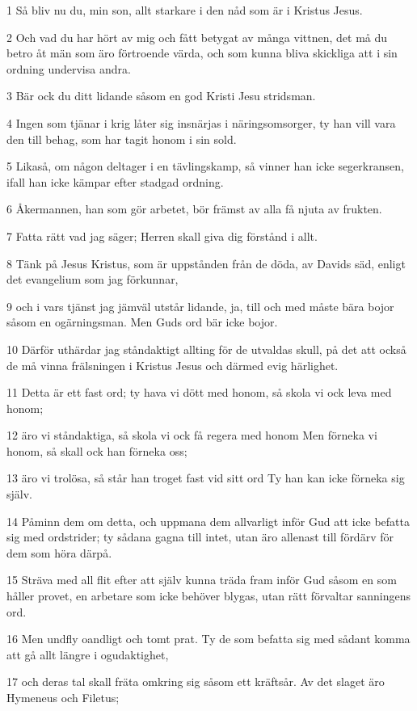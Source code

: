 \par 1 Så bliv nu du, min son, allt starkare i den nåd som är i Kristus Jesus.
\par 2 Och vad du har hört av mig och fått betygat av många vittnen, det må du betro åt män som äro förtroende värda, och som kunna bliva skickliga att i sin ordning undervisa andra.
\par 3 Bär ock du ditt lidande såsom en god Kristi Jesu stridsman.
\par 4 Ingen som tjänar i krig låter sig insnärjas i näringsomsorger, ty han vill vara den till behag, som har tagit honom i sin sold.
\par 5 Likaså, om någon deltager i en tävlingskamp, så vinner han icke segerkransen, ifall han icke kämpar efter stadgad ordning.
\par 6 Åkermannen, han som gör arbetet, bör främst av alla få njuta av frukten.
\par 7 Fatta rätt vad jag säger; Herren skall giva dig förstånd i allt.
\par 8 Tänk på Jesus Kristus, som är uppstånden från de döda, av Davids säd, enligt det evangelium som jag förkunnar,
\par 9 och i vars tjänst jag jämväl utstår lidande, ja, till och med måste bära bojor såsom en ogärningsman. Men Guds ord bär icke bojor.
\par 10 Därför uthärdar jag ståndaktigt allting för de utvaldas skull, på det att också de må vinna frälsningen i Kristus Jesus och därmed evig härlighet.
\par 11 Detta är ett fast ord; ty hava vi dött med honom, så skola vi ock leva med honom;
\par 12 äro vi ståndaktiga, så skola vi ock få regera med honom Men förneka vi honom, så skall ock han förneka oss;
\par 13 äro vi trolösa, så står han troget fast vid sitt ord Ty han kan icke förneka sig själv.
\par 14 Påminn dem om detta, och uppmana dem allvarligt inför Gud att icke befatta sig med ordstrider; ty sådana gagna till intet, utan äro allenast till fördärv för dem som höra därpå.
\par 15 Sträva med all flit efter att själv kunna träda fram inför Gud såsom en som håller provet, en arbetare som icke behöver blygas, utan rätt förvaltar sanningens ord.
\par 16 Men undfly oandligt och tomt prat. Ty de som befatta sig med sådant komma att gå allt längre i ogudaktighet,
\par 17 och deras tal skall fräta omkring sig såsom ett kräftsår. Av det slaget äro Hymeneus och Filetus;
